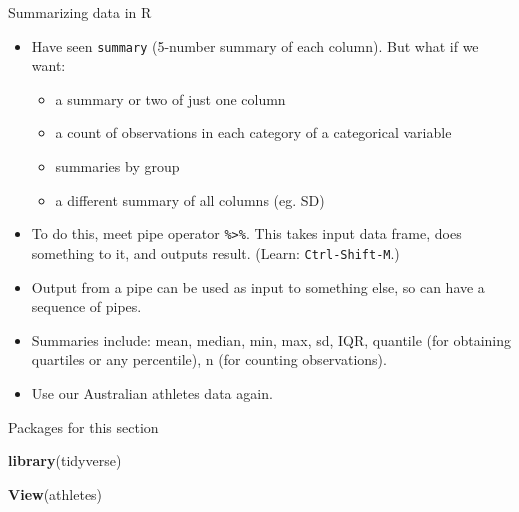 \documentclass[ignorenonframetext,]{beamer}
\newenvironment{Shaded}{\begin{snugshade}}{\end{snugshade}}
\newcommand{\KeywordTok}[1]{\textcolor[rgb]{0.13,0.29,0.53}{\textbf{#1}}}
\newcommand{\NormalTok}[1]{#1}
\providecommand{\tightlist}{%
  \setlength{\itemsep}{0pt}\setlength{\parskip}{0pt}}
\begin{document}
\begin{frame}[fragile]{Summarizing data in R}
\protect\hypertarget{summarizing-data-in-r}{}

\begin{itemize}
\tightlist
\item
  Have seen \texttt{summary} (5-number summary of each column). But what
  if we want:

  \begin{itemize}
  \tightlist
  \item
    a summary or two of just one column
  \item
    a count of observations in each category of a categorical variable
  \item
    summaries by group
  \item
    a different summary of all columns (eg. SD)
  \end{itemize}
\item
  To do this, meet pipe operator \texttt{\%\textgreater{}\%}. This takes
  input data frame, does something to it, and outputs result. (Learn:
  \texttt{Ctrl-Shift-M}.)
\item
  Output from a pipe can be used as input to something else, so can have
  a sequence of pipes.
\item
  Summaries include: mean, median, min, max, sd, IQR, quantile (for
  obtaining quartiles or any percentile), n (for counting observations).
\item
  Use our Australian athletes data again.
\end{itemize}

\end{frame}

\begin{frame}[fragile]{Packages for this section}
\protect\hypertarget{packages-for-this-section-2}{}

\begin{Shaded}
\begin{Highlighting}[]
\KeywordTok{library}\NormalTok{(tidyverse)}
\end{Highlighting}
\end{Shaded}

\begin{Shaded}
\begin{Highlighting}[]
\KeywordTok{View}\NormalTok{(athletes)}
\end{Highlighting}
\end{Shaded}

\end{frame}
\end{document}
